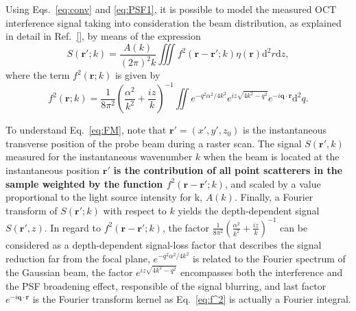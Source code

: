 Using Eqs.~\ref{eq:conv} and \ref{eq:PSF1}, it is possible to model the measured OCT interference signal taking into consideration the beam distribution, as explained in detail in Ref.~\ref{}, by means of the expression
\begin{equation}\label{eq:FM}
    S(\mathbf{r'}; k) = \frac{A(k)}{(2\pi)^2 k} \iiint f^2(\mathbf{r}-\mathbf{r'}; k) \eta(\mathbf{r}) \text{d}^2r \text{d}z,
\end{equation}
where the term $f^2(\mathbf{r}; k)$ is given by
\begin{equation}\label{eq:f^2}
    f^2(\mathbf{r}; k) = \frac{1}{8\pi^2}\left(\frac{\alpha^2}{k^2}+\frac{iz}{k}\right)^{-1} \iint e^{-q^2\alpha^2/4k^2} e^{iz\sqrt{4k^2-q^2}} e^{-i\mathbf{q}\cdot \mathbf{r}} \text{d}^2q.
\end{equation}

To understand Eq.~\ref{eq:FM}, note that $\mathbf{r'}=(x',y',z_0)$ is the instantaneous transverse position of the probe beam during a raster scan. The signal $S(\mathbf{r'},k)$ measured for the instantaneous wavenumber $k$ when the beam is located at the instantaneous position $\mathbf{r'}$ \textbf{is the contribution of all point scatterers in the sample weighted by the function $f^2(\mathbf{r}-\mathbf{r'}; k)$}, and scaled by a value proportional to the light source intensity for k, $A(k)$. Finally, a Fourier transform of $S(\mathbf{r'}; k)$ with respect to $k$ yields the depth-dependent signal $S(\mathbf{r'}, z)$. In regard to $f^2(\mathbf{r}-\mathbf{r'}; k)$, the factor $\frac{1}{8\pi^2}\left(\frac{\alpha^2}{k^2}+\frac{iz}{k}\right)^{-1}$ can be considered as a depth-dependent signal-loss factor that describes the signal reduction far from the focal plane, $e^{-q^2\alpha^2/4k^2}$ is related to the Fourier spectrum of the Gaussian beam, the factor $e^{iz\sqrt{4k^2-q^2}}$ encompasses both the interference and the PSF broadening effect, responsible of the signal blurring, and last factor $e^{-i\mathbf{q}\cdot \mathbf{r}}$ is the Fourier transform kernel as Eq.~\ref{eq:f^2} is actually a Fourier integral.

